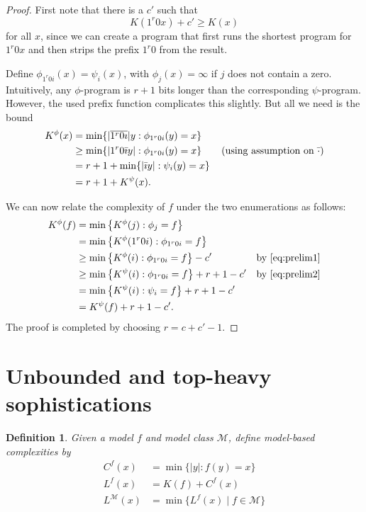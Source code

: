 \documentclass{article}
\newtheorem{definition}{Definition}
\newcommand{\M}{\mathcal M}
\newcommand{\tn}[1]{\textnormal{#1}}
\begin{document}
\begin{proof}
First note that there is a $c'$ such that 
\begin{equation}
	K(1^r 0  x) + c' \geq K(x) \label{eq:prelim1}
\end{equation}
for all $x$, since we can create a program that first runs the shortest program for $1^r 0 x$ and then strips the prefix $1^r 0$ from the result.

Define $\phi_{1^r0i}(x) = \psi_{i}(x)$, with $\phi_{j}(x) = \infty$ if $j$ does not contain a zero. Intuitively, any $\phi$-program is $r+1$ bits longer than the corresponding $\psi$-program. However, the used prefix function complicates this slightly. But all we need is the bound
\begin{equation}\label{eq:prelim2}\begin{split}
K^\phi(x) &= \min \{ |\overline{1^r 0 \imath}| y : \phi_{1^r 0 i}(y) = x \}\\
&  \ge \min\{|1^r0\bar\imath y| : \phi_{1^r 0 i}(y) = x \}\qquad\tn{(using assumption on $\bar\cdot$)}\\
& = r+1 +\min\{|\bar\imath y| : \psi_i(y) = x \}\\
& = r+1+K^\psi(x).
\end{split}\end{equation}

We can now relate the complexity of $f$ under the two enumerations as follows:
\begin{align*}
K^\phi(f) &= \min\left\{ K^\phi(j) : \phi_j = f \right\}& \\
       &= \min\left\{ K^\phi(1^r0i) : \phi_{1^r0i} = f \right\}& \\
       &\ge  \min\left\{ K^\phi(i) : \phi_{1^r0i} = f \right\}-c'&\text{by~\eqref{eq:prelim1}}\\
       &\geq \min\left\{ K^\psi(i)  : \phi_{1^r0i} = f \right\}+r+1-c'& \text{by \eqref{eq:prelim2}}\\
       &= \min\left\{ K^\psi(i) : \psi_{i} = f \right\} + r+1 -c'& \\
       &= K^\psi(f) + r + 1 - c'.
\end{align*}
The proof is completed by choosing $r=c+c'-1$.
\end{proof}

\section{Unbounded and top-heavy sophistications}

\begin{definition}
  Given a model $f$ and model class $\M$, define model-based complexities by
  \begin{align*}
  C^f(x) &= \min\{|y|:f(y)=x\}\\
  L^f(x) &= K(f)+C^f(x)\\
  L^{\M}(x) &= \min\{L^f(x)\mid f\in\M\}
  \end{align*}
\end{definition}
\end{document}

